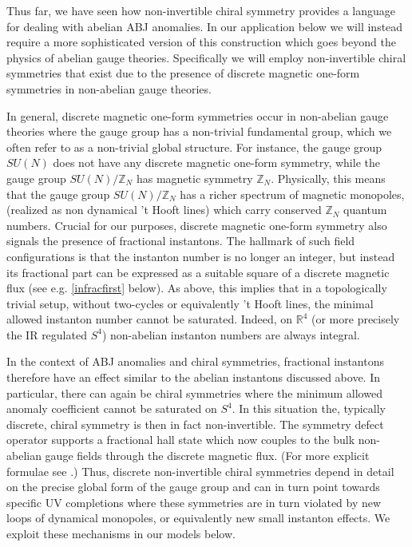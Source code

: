 \documentclass[11pt,a4paper]{article}
\begin{document}
Thus far, we have seen how non-invertible chiral symmetry provides a language for dealing with abelian ABJ anomalies.  In our application below we will instead require a more sophisticated version of this construction which goes beyond the physics of abelian gauge theories.  Specifically we will employ non-invertible chiral symmetries that exist due to the presence of discrete magnetic one-form symmetries in non-abelian gauge theories.  

In general, discrete magnetic one-form symmetries occur in non-abelian gauge theories where the gauge group has a non-trivial fundamental group, which we often refer to as a non-trivial global structure.  For instance, the gauge group $SU(N)$ does not have any discrete magnetic one-form symmetry, while the gauge group $SU(N)/\mathbb{Z}_{N}$ has magnetic symmetry $\mathbb{Z}_{N}.$  Physically, this means that the gauge group $SU(N)/\mathbb{Z}_{N}$ has a richer spectrum of magnetic monopoles, (realized as non dynamical 't Hooft lines) which carry conserved $\mathbb{Z}_{N}$ quantum numbers.  Crucial for our purposes, discrete magnetic one-form symmetry also signals the presence of fractional instantons.  The hallmark of such field configurations is that the instanton number is no longer an integer, but instead its fractional part can be expressed as a suitable square of a discrete magnetic flux (see e.g. \eqref{infracfirst} below). As above, this implies that in a topologically trivial setup, without two-cycles or equivalently 't Hooft lines, the minimal allowed instanton number cannot be saturated.  Indeed, on $\mathbb{R}^{4}$ (or more precisely the IR regulated $S^{4}$) non-abelian instanton numbers are always integral.

In the context of ABJ anomalies and chiral symmetries, fractional instantons therefore have an effect similar to the abelian instantons discussed above.  In particular, there can again be chiral symmetries where the minimum allowed anomaly coefficient cannot be saturated on $S^{4}$.  In this situation the, typically discrete, chiral symmetry is then in fact non-invertible.  The symmetry defect operator supports a fractional hall state which now couples to the bulk non-abelian gauge fields through the discrete magnetic flux.  (For more explicit formulae see \cite{Cordova:2022ieu}.)
Thus, discrete non-invertible chiral symmetries depend in detail on the precise global form of the gauge group and can in turn point towards specific UV completions where these symmetries are in turn violated by new loops of dynamical monopoles, or equivalently new small instanton effects.  We exploit these mechanisms in our models below. 
\end{document}
